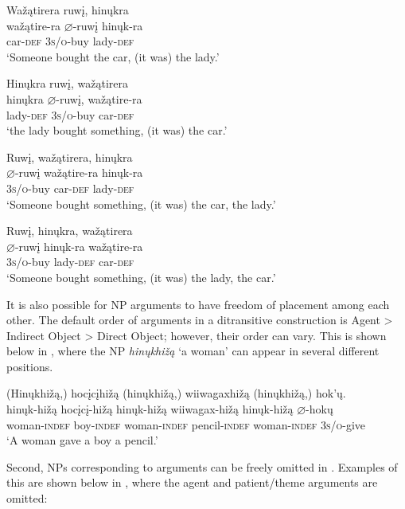 \documentclass[output=paper]{LSP/langsci}
\begin{document}
\ex
\glll Wa\v{z}ątirera		ruw\k{i},			hin\k{u}kra\\
wa\v{z}ątire-ra	$\varnothing$-ruw\k{i}	hin\k{u}k-ra \\
car-\textsc{def} 			\textsc{3s/o}-buy 	lady-\textsc{def} \\
\trans `Someone bought the car, (it was) the lady.' 

\ex
\glll Hin\k{u}kra 		ruw\k{i}, 		wa\v{z}ątirera \\
hin\k{u}kra 	$\varnothing$-ruw\k{i}, 		wa\v{z}ątire-ra \\
lady-\textsc{def} \textsc{3s/o}-buy car-\textsc{def} \\
\trans `the lady bought something, (it was) the car.' 

\ex
\glll Ruw\k{i}, 		wa\v{z}ątirera,	hin\k{u}kra\\
$\varnothing$-ruw\k{i}	wa\v{z}ątire-ra	hin\k{u}k-ra \\
\textsc{3s/o}-buy car-\textsc{def} lady-\textsc{def} \\
\trans `Someone bought something, (it was) the car, the lady.' 

\ex
\glll Ruw\k{i}, 		hin\k{u}kra, 	wa\v{z}ątirera \\
$\varnothing$-ruw\k{i} 	hin\k{u}k-ra 	wa\v{z}ątire-ra \\ 
\textsc{3s/o}-buy lady-\textsc{def} car-\textsc{def} \\
\trans `Someone bought something, (it was) the lady, the car.'
\z

It is also possible for NP arguments to have freedom of placement among each other. The default order of arguments in a ditransitive construction is Agent > Indirect Object > Direct Object; however, their order can vary.  This is shown below in , where the  NP \textit{hin\k{u}khi\v{z}ą} `a woman' can appear in several different positions.

\ea\label{ex:jrs:13}
\glll (Hin\k{u}khi\v{z}ą,) 	hoc\k{i}c\k{i}hi\v{z}ą 	(hin\k{u}khi\v{z}ą,) wiiwagaxhi\v{z}ą 	(hin\k{u}khi\v{z}ą,) hok'\k{u}.\\
hin\k{u}k-hi\v{z}ą 		hoc\k{i}c\k{i}-hi\v{z}ą 	hin\k{u}k-hi\v{z}ą 		wiiwagax-hi\v{z}ą 	hin\k{u}k-hi\v{z}ą 	$\varnothing$-hok\k{u}\\
	woman-\textsc{indef}	boy-\textsc{indef} 	woman-\textsc{indef} 	pencil-\textsc{indef} 	woman-\textsc{indef} 	\textsc{3s/o}-give\\
\trans `A woman gave a boy a pencil.'
\z
	
Second, NPs corresponding to arguments can be freely omitted in . Examples of this are shown below in , where the agent and patient/theme arguments are omitted:
\end{document}
